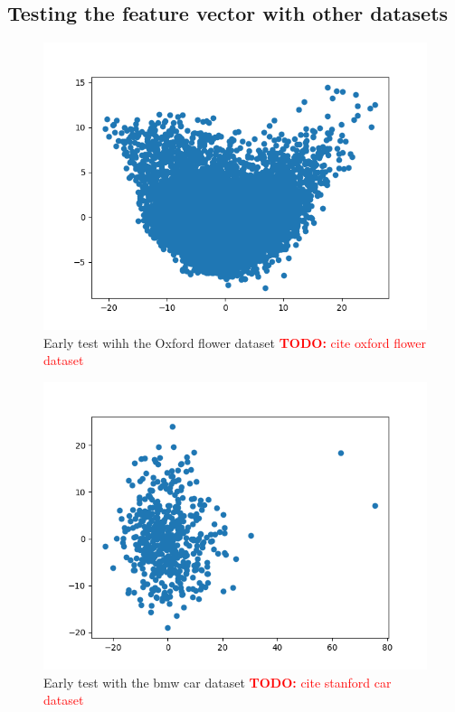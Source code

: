 \documentclass[journal]{vgtc}       %
\newcommand{\todo}[1]{\textcolor{red}{\textbf{TODO:} #1}}
\begin{document}
\subsection{Testing the feature vector with other datasets}
\begin{figure}[tb]
	\begin{center}
		\includegraphics[width=.75\linewidth]{Figure1.png}
	\end{center}
	\caption{\label{fig:lorem} Early test wihh the Oxford flower dataset \todo{cite oxford flower dataset}}
\end{figure} 
\begin{figure}[tb]
	\begin{center}
		\includegraphics[width=.75\linewidth]{Figure2.png}
	\end{center}
	\caption{\label{fig:bmw} Early test with the bmw car dataset \todo{cite stanford car dataset}\cite{stanfordcar}}
\end{figure}
\end{document}
